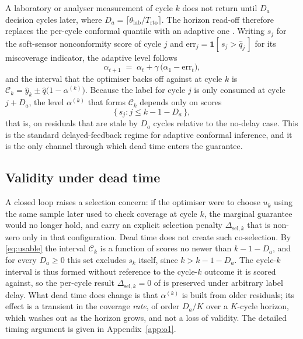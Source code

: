 \documentclass[review,12pt]{elsarticle}
\begin{document}
A laboratory or analyser measurement of cycle $k$ does not return until $D_a$ decision cycles
later, where $D_a=\lceil \theta_{\mathrm{lab}}/T_{\mathrm{rto}}\rceil$. The horizon read-off
therefore replaces the per-cycle conformal quantile with an adaptive one
\citep{gibbs2021}. Writing $s_j$ for the soft-sensor nonconformity score of cycle $j$ and
$\mathrm{err}_j=\mathbf{1}[\,s_j>\hat q_j\,]$ for its miscoverage indicator, the adaptive level
follows
\begin{equation}
  \alpha_{t+1} \;=\; \alpha_t + \gamma\,\big(\alpha_1 - \mathrm{err}_{t}\big),
  \label{eq:aci}
\end{equation}
and the interval that the optimiser backs off against at cycle $k$ is
$\mathcal{C}_k=\hat y_k \pm \hat q\big(1-\alpha^{(k)}\big)$. Because the label for cycle $j$
is only consumed at cycle $j+D_a$, the level $\alpha^{(k)}$ that forms $\mathcal{C}_k$ depends
only on scores
\begin{equation}
  \{\, s_j : j \le k-1-D_a \,\},
  \label{eq:usable}
\end{equation}
that is, on residuals that are stale by $D_a$ cycles relative to the no-delay case. This is the
standard delayed-feedback regime for adaptive conformal inference, and it is the only channel
through which dead time enters the guarantee.

\subsection{Validity under dead time}
\label{sec:o1}

A closed loop raises a selection concern: if the optimiser were to choose $u_k$ using the same
sample later used to check coverage at cycle $k$, the marginal guarantee would no longer hold,
and \citet{busico_m4} carry an explicit selection penalty $\Delta_{\mathrm{sel},k}$ that is
non-zero only in that configuration. Dead time does not create such co-selection. By
\eqref{eq:usable} the interval $\mathcal{C}_k$ is a function of scores no newer than
$k-1-D_a$, and for every $D_a\ge 0$ this set excludes $s_k$ itself, since $k>k-1-D_a$. The
cycle-$k$ interval is thus formed without reference to the cycle-$k$ outcome it is scored
against, so the per-cycle result $\Delta_{\mathrm{sel},k}=0$ of \citet{busico_m4} is preserved
under arbitrary label delay. What dead time does change is that $\alpha^{(k)}$ is built from
older residuals; its effect is a transient in the coverage \emph{rate}, of order $D_a/K$ over a
$K$-cycle horizon, which washes out as the horizon grows, and not a loss of validity. The
detailed timing argument is given in Appendix~\ref{app:o1}.
\end{document}

